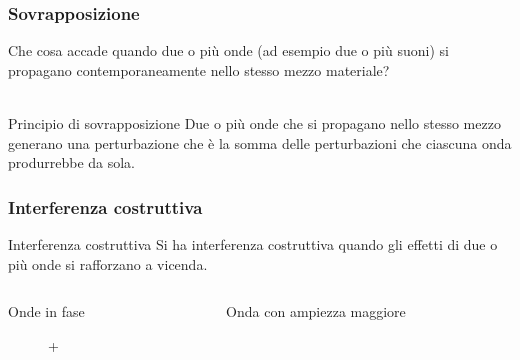 \documentclass[]{beamer}
\theoremstyle{plain}
\begin{document}
\begin{frame}
  \frametitle{Sovrapposizione}
  Che cosa accade quando due o più onde (ad esempio due o più suoni) si propagano contemporaneamente nello stesso mezzo materiale?\\~\pause
  \begin{block}{Principio di sovrapposizione}
    Due o più onde che si propagano nello stesso mezzo generano una perturbazione che è la \alert{somma} delle perturbazioni che ciascuna onda produrrebbe da sola.
  \end{block}
\end{frame}

\begin{frame}
  \frametitle{Interferenza costruttiva}
  \begin{block}{Interferenza costruttiva}
    Si ha interferenza costruttiva quando gli effetti di due o più onde si rafforzano a vicenda.
  \end{block}\pause
  
  \begin{columns}
\begin{column}{0.5\textwidth}
\begin{center}
Onde in fase
\end{center}
\begin{figure}

+

\end{figure}

\end{column}
\begin{column}{0.5\textwidth}
\begin{center}
Onda con ampiezza maggiore
\end{center}
\begin{figure}
\end{figure}

\end{column}
\end{columns}

\end{frame}
\end{document}
